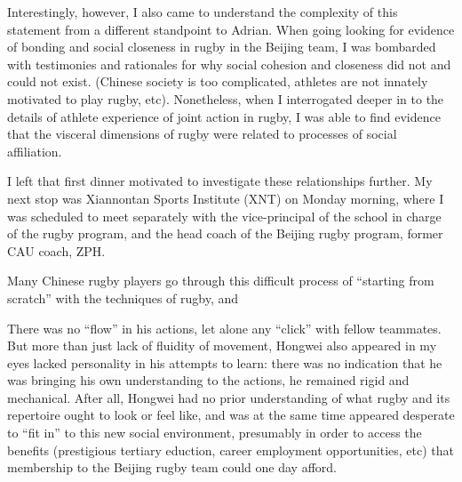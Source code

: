 Interestingly, however, I also came to understand the complexity of this statement from a different standpoint to Adrian.  When going looking for evidence of bonding and social closeness in rugby in the Beijing team, I was bombarded with testimonies and rationales for why social cohesion and closeness did not and could not exist.  (Chinese society is too complicated, athletes are not innately motivated to play rugby, etc).  Nonetheless, when I interrogated deeper in to the details of athlete experience of joint action in rugby, I was able to find evidence that the visceral dimensions of rugby were related to processes of social affiliation.

I left that first dinner motivated to investigate these relationships further.  My next stop was Xiannontan Sports Institute (XNT) on Monday morning, where I was scheduled to meet separately with the vice-principal of the school in charge of the rugby program, and the head coach of the Beijing rugby program, former CAU coach, ZPH.








Many Chinese rugby players go through this difficult process of ``starting from scratch'' with the techniques of rugby, and

There was no ``flow'' in his actions, let alone any ``click'' with fellow teammates.  But more than just lack of fluidity of movement, Hongwei also appeared in my eyes lacked personality in his attempts to learn: there was no indication that he was bringing his own understanding to the actions, he remained rigid and mechanical.  After all, Hongwei had no prior understanding of what rugby and its repertoire ought to look or feel like, and was at the same time appeared desperate to ``fit in'' to this new social environment, presumably in order to access the benefits (prestigious tertiary eduction, career employment opportunities, etc) that membership to the Beijing rugby team could one day afford.
